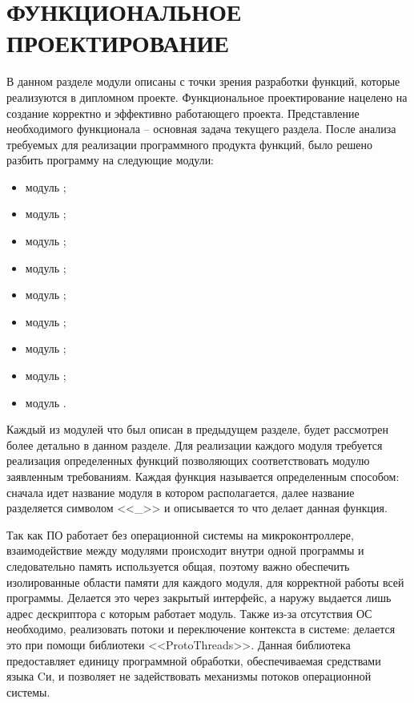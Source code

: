 \section{ФУНКЦИОНАЛЬНОЕ ПРОЕКТИРОВАНИЕ}
\label{sec:func}


В данном разделе модули описаны с точки зрения разработки функций, которые реализуются в
дипломном проекте. Функциональное проектирование нацелено на создание корректно и
эффективно работающего проекта. Представление необходимого функционала -- основная задача
текущего раздела. После анализа требуемых для реализации программного продукта
функций, было решено разбить программу на следующие модули:
\begin{itemize}
    \item модуль \modulePerifery;
    \item модуль \moduleCalib;
    \item модуль \moduleCalibControl;
    \item модуль \moduleUart;
    \item модуль \moduleMoveDetect;
    \item модуль \moduleOrientationAzimuth;
    \item модуль \moduleFindTarget;
    \item модуль \moduleFlashMemory;
    \item модуль \moduleGraphics.
\end{itemize}

Каждый из модулей что был описан в предыдущем разделе, будет рассмотрен более детально
в данном разделе. Для реализации каждого модуля требуется реализация определенных функций
позволяющих соответствовать модулю заявленным требованиям.
Каждая функция называется определенным способом: сначала идет название модуля в котором располагается,
далее название разделяется символом <<\_>> и описывается то что делает данная функция.

Так как ПО работает без операционной системы на микроконтроллере, взаимодействие между модулями происходит
внутри одной программы и следовательно память используется общая, поэтому важно обеспечить изолированные
области памяти для каждого модуля, для корректной работы всей программы. Делается это через закрытый интерфейс,
а наружу выдается лишь адрес дескриптора с которым работает модуль. Также из-за отсутствия ОС необходимо,
реализовать потоки и переключение контекста в системе: делается это при помощи библиотеки <<ProtoThreads>>.
Данная библиотека предоставляет единицу программной обработки, обеспечиваемая средствами языка Cи, и позволяет
не задействовать механизмы потоков операционной системы.

